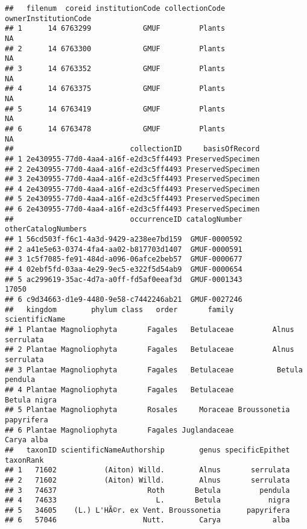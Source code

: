 \documentclass[
]{article}
\begin{document}
\begin{verbatim}
##   filenum  coreid institutionCode collectionCode ownerInstitutionCode
## 1      14 6763299            GMUF         Plants                   NA
## 2      14 6763300            GMUF         Plants                   NA
## 3      14 6763352            GMUF         Plants                   NA
## 4      14 6763375            GMUF         Plants                   NA
## 5      14 6763419            GMUF         Plants                   NA
## 6      14 6763478            GMUF         Plants                   NA
##                           collectionID     basisOfRecord
## 1 2e430955-77d0-4aa4-a16f-e2d3c5ff4493 PreservedSpecimen
## 2 2e430955-77d0-4aa4-a16f-e2d3c5ff4493 PreservedSpecimen
## 3 2e430955-77d0-4aa4-a16f-e2d3c5ff4493 PreservedSpecimen
## 4 2e430955-77d0-4aa4-a16f-e2d3c5ff4493 PreservedSpecimen
## 5 2e430955-77d0-4aa4-a16f-e2d3c5ff4493 PreservedSpecimen
## 6 2e430955-77d0-4aa4-a16f-e2d3c5ff4493 PreservedSpecimen
##                           occurrenceID catalogNumber otherCatalogNumbers
## 1 56cd503f-f6c1-4a3d-9429-a238ee7bd159  GMUF-0000592                    
## 2 a41e5e63-0374-4fa4-aa02-b817703d1407  GMUF-0000591                    
## 3 1c5f7085-fe91-484d-a096-06afce2beb57  GMUF-0000677                    
## 4 02ebf5fd-03aa-4e29-9ec5-e322f5d54ab9  GMUF-0000654                    
## 5 ac299619-35ac-4d7a-a0ff-fd5af0eeaf3d  GMUF-0001343               17050
## 6 c9d34663-d1e9-4480-9e58-c7442246ab21  GMUF-0027246                    
##   kingdom        phylum class   order       family          scientificName
## 1 Plantae Magnoliophyta       Fagales   Betulaceae         Alnus serrulata
## 2 Plantae Magnoliophyta       Fagales   Betulaceae         Alnus serrulata
## 3 Plantae Magnoliophyta       Fagales   Betulaceae          Betula pendula
## 4 Plantae Magnoliophyta       Fagales   Betulaceae            Betula nigra
## 5 Plantae Magnoliophyta       Rosales     Moraceae Broussonetia papyrifera
## 6 Plantae Magnoliophyta       Fagales Juglandaceae              Carya alba
##   taxonID scientificNameAuthorship        genus specificEpithet taxonRank
## 1   71602           (Aiton) Willd.        Alnus       serrulata          
## 2   71602           (Aiton) Willd.        Alnus       serrulata          
## 3   74637                     Roth       Betula         pendula          
## 4   74633                       L.       Betula           nigra          
## 5   34605    (L.) L'HÃ©r. ex Vent. Broussonetia      papyrifera          
## 6   57046                    Nutt.        Carya            alba          

\end{verbatim}
\end{document}
